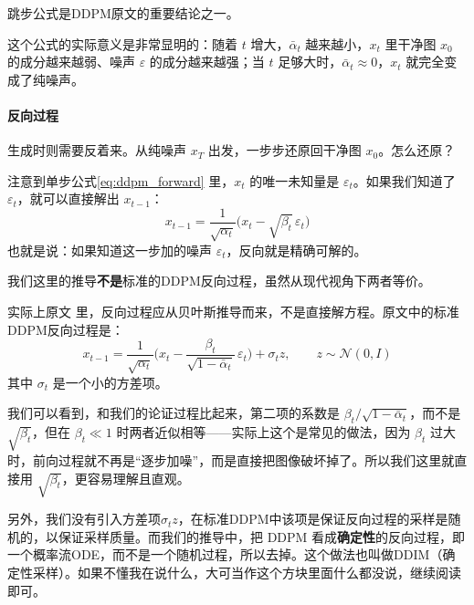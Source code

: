 跳步公式是DDPM原文的重要结论之一。

这个公式的实际意义是非常显明的：随着 $t$ 增大，$\bar\alpha_t$ 越来越小，$x_t$ 里干净图 $x_0$ 的成分越来越弱、噪声 $\varepsilon$ 的成分越来越强；当 $t$ 足够大时，$\bar\alpha_t \approx 0$，$x_t$ 就完全变成了纯噪声。

\paragraph{反向过程}

生成时则需要反着来。从纯噪声 $x_T$ 出发，一步步还原回干净图 $x_0$。怎么还原？

注意到单步公式\eqref{eq:ddpm_forward} 里，$x_t$ 的唯一未知量是 $\varepsilon_t$。如果我们知道了 $\varepsilon_t$，就可以直接解出 $x_{t-1}$：
\begin{equation}\label{eq:reverse_alg}
x_{t-1} = \frac{1}{\sqrt{\alpha_t}}\big(x_t - \sqrt{\beta_t}\,\varepsilon_t\big)
\end{equation}
也就是说：如果知道这一步加的噪声 $\varepsilon_t$，反向就是精确可解的。

\begin{framed}{}
我们这里的推导\textbf{不是}标准的DDPM反向过程，虽然从现代视角下两者等价。

实际上原文\cite{ho2020denoisingdiffusionprobabilisticmodels} 里，反向过程应从贝叶斯推导而来，不是直接解方程。原文中的标准DDPM反向过程是：
\begin{equation}
x_{t-1} = \frac{1}{\sqrt{\alpha_t}}\big(x_t - \frac{\beta_t}{\sqrt{1-\bar\alpha_t}}\,\varepsilon_t\big) + \sigma_t z,\qquad z\sim\mathcal N(0,I)   
\end{equation}
其中 $\sigma_t$ 是一个小的方差项。

我们可以看到，和我们的论证过程比起来，第二项的系数是 $\beta_t/\sqrt{1-\bar\alpha_t}$，而不是 $\sqrt{\beta_t}$，但在 $\beta_t\ll1$ 时两者近似相等——实际上这个是常见的做法，因为 $\beta_t$ 过大时，前向过程就不再是“逐步加噪”，而是直接把图像破坏掉了。所以我们这里就直接用 $\sqrt{\beta_t}$，更容易理解且直观。

另外，我们没有引入方差项$\sigma_t z$，在标准DDPM中该项是保证反向过程的采样是随机的，以保证采样质量。而我们的推导中，把 DDPM 看成\textbf{确定性}的反向过程，即一个概率流ODE，而不是一个随机过程，所以去掉。这个做法也叫做DDIM（确定性采样）\cite{song2022denoisingdiffusionimplicitmodels}。如果不懂我在说什么，大可当作这个方块里面什么都没说，继续阅读即可。
\end{framed}


